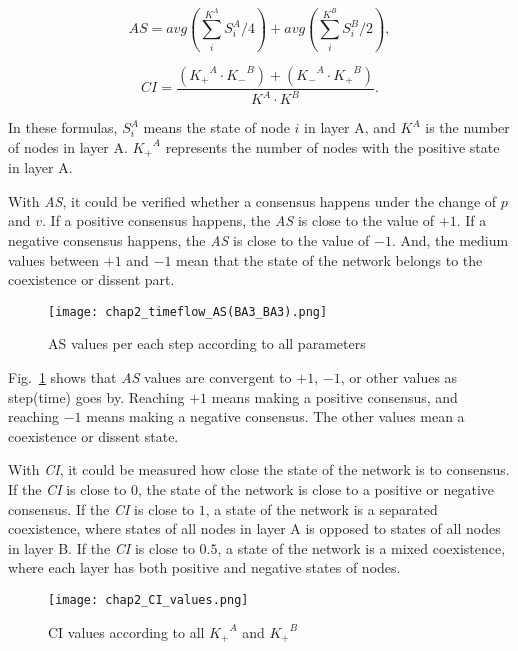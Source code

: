 \begin{equation}
AS = avg\left( {\sum\limits_i^{{K^A}} {S_i^A/4} } \right) + avg\left( {\sum\limits_i^{{K^B}} {S_i^B/2} } \right),
\end{equation}

\begin{equation}
CI = \frac{{({K_ + }^A \cdot {K_ - }^B) + ({K_ - }^A \cdot {K_ + }^B)}}{{{K^A} \cdot {K^B}}}.
\end{equation}

In these formulas, $S_i^A$ means the state of node $i$ in layer A, and $K^A$ is the number of nodes in layer A. ${K_ + }^A$ represents the number of nodes with the positive state in layer A.   

With \textit{AS}, it could be verified whether a consensus happens under the change of $p$ and $v$.  If a positive consensus happens, the \textit{AS} is close to the value of $+1$. If a negative consensus happens, the \textit{AS} is close to the value of $-1$. And, the medium values between $+1$ and $-1$ mean that the state of the network belongs to the coexistence or dissent part.

\begin{figure}[!htb]
	\centering
	\texttt{[image: chap2\_timeflow\_AS(BA3\_BA3).png]}
	\caption{AS values per each step according to all parameters}
	\label{chap2_timeflow_AS(BA3_BA3)}
\end{figure}

Fig.~\ref{chap2_timeflow_AS(BA3_BA3)} shows that \textit{AS} values are convergent to $+1$, $-1$, or other values as step(time) goes by. Reaching $+1$ means making a positive consensus, and reaching $-1$ means making a negative consensus. The other values mean a coexistence or dissent state. 

With \textit{CI}, it could be measured how close the state of the network is to consensus. If the \textit{CI} is close to $0$, the state of the network is close to a positive or negative consensus. If the \textit{CI} is close to $1$, a state of the network is a separated coexistence, where states of all nodes in layer A is opposed to states of all nodes in layer B. If the \textit{CI} is close to $0.5$, a state of the network is a mixed coexistence, where each layer has both positive and negative states of nodes.

\begin{figure}[!htb]
	\centering
	\texttt{[image: chap2\_CI\_values.png]}
	\caption{CI values according to all ${K_ + }^A$ and ${K_ + }^B$  }
	\label{chap2_CI_values}
\end{figure}

